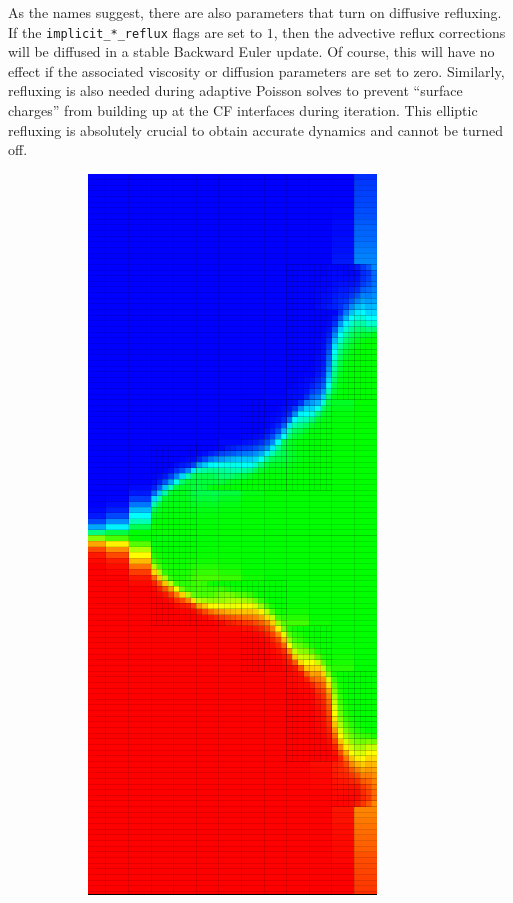 \documentclass[12pt]{article}
\begin{document}
As the names suggest, there are also parameters that turn on diffusive refluxing. If the \texttt{implicit\_*\_reflux} flags are set to $1$, then the advective reflux corrections will be diffused in a stable Backward Euler update. Of course, this will have no effect if the associated viscosity or diffusion parameters are set to zero. Similarly, refluxing is also needed during adaptive Poisson solves to prevent ``surface charges'' from building up at the CF interfaces during iteration. This elliptic refluxing is absolutely crucial to obtain accurate dynamics and cannot be turned off.

\begin{figure}
\centering
\begin{subfigure}{.5\textwidth}
  \centering
  \includegraphics[width=.75\linewidth]{AdvectionCFErrorCropped.png}

\end{subfigure}
\end{figure}
\end{document}
